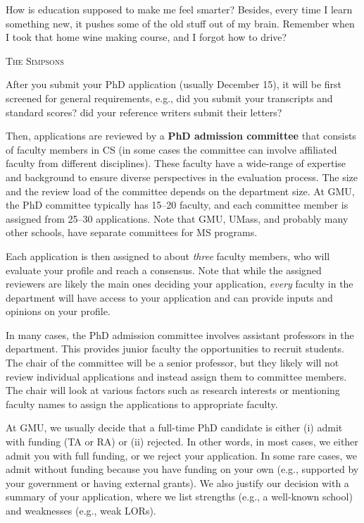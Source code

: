 \documentclass[11pt]{article}
\begin{document}
\epigraph{How is education supposed to make me feel smarter? Besides, every time I learn something new, it pushes some of the old stuff out of my brain. Remember when I took that home wine making course, and I forgot how to drive?}{\textsc{The Simpsons}}

After you submit your PhD application (usually December 15), it will be first screened
for general requirements, e.g., did you submit your transcripts and standard scores? did your reference writers submit their letters?

Then, applications are reviewed by a \textbf{PhD admission committee} that consists of faculty members in CS (in some cases the committee can involve affiliated faculty from different disciplines). These faculty have a wide-range of expertise and background to ensure diverse perspectives in the evaluation process. The size and the review load of the committee depends on the department size. At GMU, the PhD committee typically has 15--20 faculty, and each committee member is assigned from 25--30 applications. Note that GMU, UMass, and probably many other schools, have separate committees for MS programs.

Each application is then assigned to about \emph{three} faculty members, who will evaluate your profile and reach a consensus.  Note that while the assigned reviewers are likely the main ones deciding your application, \emph{every} faculty in the department will have access to your application and can provide inputs and opinions on your profile.

In many cases, the PhD admission committee involves assistant professors in the department. This provides junior faculty the opportunities to recruit students. The chair of the committee will be a senior professor, but they likely will not review individual applications and instead assign them to committee members. The chair will look at various factors such as research interests or mentioning faculty names to assign the applications to appropriate faculty. 

At GMU, we usually decide that a full-time PhD candidate is either (i) admit with funding (TA or RA) or (ii) rejected. In other words, in most cases, we either
admit you with full funding, or we reject your application. In some rare cases, we admit
without funding because you have funding on your own (e.g.,
supported by your government or having external grants). We also justify
our decision with a summary of your application, where we list
strengths (e.g., a well-known school) and weaknesses (e.g., weak
LORs). 
\end{document}

